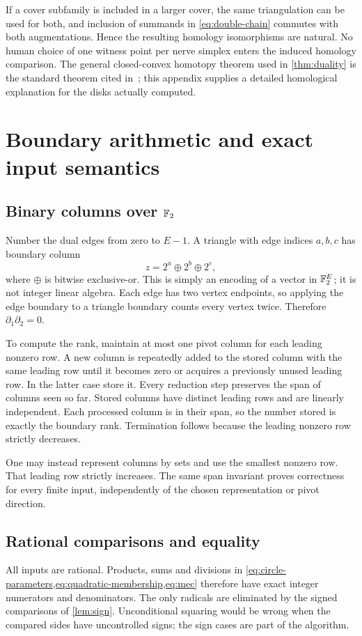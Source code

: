 If a cover subfamily is included in a larger cover, the same triangulation can be used for both, and inclusion of summands in \cref{eq:double-chain} commutes with both augmentations. Hence the resulting homology isomorphisms are natural. No human choice of one witness point per nerve simplex enters the induced homology comparison. The general closed-convex homotopy theorem used in \cref{thm:duality} is the standard theorem cited in~\cite{bauer}; this appendix supplies a detailed homological explanation for the disks actually computed.

\section{Boundary arithmetic and exact input semantics}
\label{app:arithmetic}
\subsection{Binary columns over \texorpdfstring{$\mathbb F_2$}{F2}}
Number the dual edges from zero to $E-1$. A triangle with edge indices $a,b,c$ has boundary column
\[
z=2^a\mathbin{\oplus}2^b\mathbin{\oplus}2^c,
\]
where $\oplus$ is bitwise exclusive-or. This is simply an encoding of a vector in $\mathbb F_2^E$; it is not integer linear algebra. Each edge has two vertex endpoints, so applying the edge boundary to a triangle boundary counts every vertex twice. Therefore $\partial_1\partial_2=0$.

To compute the rank, maintain at most one pivot column for each leading nonzero row. A new column is repeatedly added to the stored column with the same leading row until it becomes zero or acquires a previously unused leading row. In the latter case store it. Every reduction step preserves the span of columns seen so far. Stored columns have distinct leading rows and are linearly independent. Each processed column is in their span, so the number stored is exactly the boundary rank. Termination follows because the leading nonzero row strictly decreases.

One may instead represent columns by sets and use the smallest nonzero row. That leading row strictly increases. The same span invariant proves correctness for every finite input, independently of the chosen representation or pivot direction.

\subsection{Rational comparisons and equality}
All inputs are rational. Products, sums and divisions in \cref{eq:circle-parameters,eq:quadratic-membership,eq:mec} therefore have exact integer numerators and denominators. The only radicals are eliminated by the signed comparisons of \cref{lem:sign}. Unconditional squaring would be wrong when the compared sides have uncontrolled signs; the sign cases are part of the algorithm.

